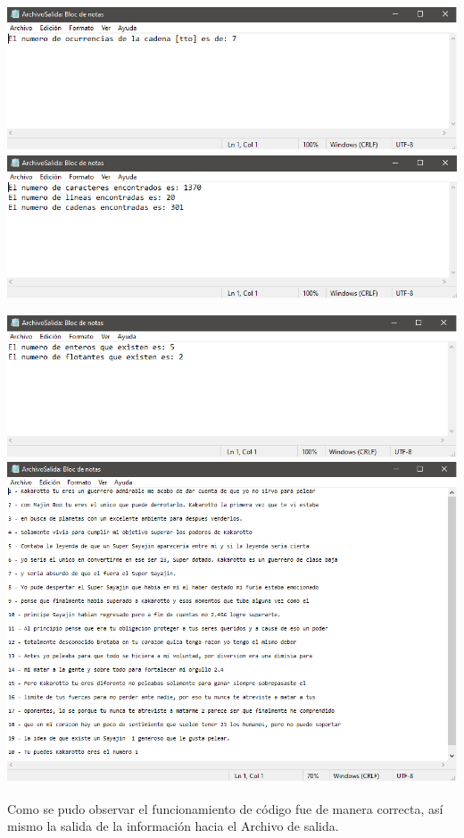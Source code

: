 \documentclass[12pt,letterpaper]{report}
\begin{document}
\begin{multicols}{2}
\includegraphics[scale=0.25]{ArchivoSalida7}\\
\includegraphics[scale=0.25]{ArchivoSalida8}
\end{multicols}


\begin{multicols}{2}
\includegraphics[scale=0.35]{ArchivoSalida9}\\
\includegraphics[scale=0.35]{ArchivoSalida10}
\end{multicols}
Como se pudo observar el funcionamiento de código fue de manera correcta, así mismo la salida de la información hacia el Archivo de salida.\\
\end{document}
